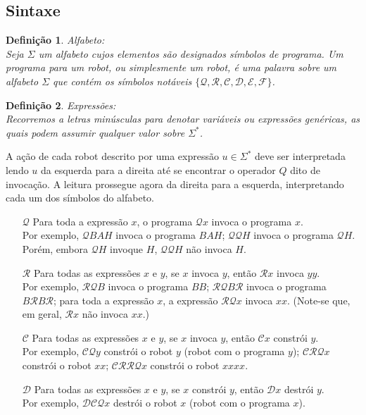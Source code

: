 \documentclass[10pt,a4paper]{report}
\newtheorem{definition}{Definição}
\begin{document}
\subsection{Sintaxe}
\begin{definition}
Alfabeto:\\
Seja $\Sigma$ um alfabeto cujos elementos são designados símbolos de programa. Um programa para um robot, ou simplesmente um robot, é uma palavra sobre um alfabeto $\Sigma$ que contém os símbolos notáveis $\{\mathcal{Q}, \mathcal{R}, \mathcal{C}, \mathcal{D}, \mathcal{E}, \mathcal{F}\}$.
\end{definition}
\begin{definition}
Expressões:\\
Recorremos a letras minúsculas para denotar variáveis ou expressões genéricas, as quais podem assumir qualquer valor sobre $\Sigma^*$.
\end{definition}
A ação de cada robot descrito por uma expressão $u \in \Sigma^*$ deve ser interpretada lendo $u$ da esquerda para a direita até se encontrar o operador $Q$ dito de invocação. A leitura prossegue agora da direita para a esquerda, interpretando cada um dos símbolos do alfabeto.
\begin{itemize}
\item[$\mathcal{Q}$] Para toda a expressão $x$, o programa $\mathcal{Q}x$ invoca o programa $x$.\\
Por exemplo, $\mathcal{Q}BAH$ invoca o programa $BAH$; $\mathcal{QQ}H$ invoca o programa $\mathcal{Q}H$. Porém, embora $\mathcal{Q}H$ invoque $H$, $\mathcal{QQ}H$ não invoca $H$.
\item[$\mathcal{R}$] Para todas as expressões $x$ e $y$, se $x$ invoca $y$, então $\mathcal{R}x$ invoca $yy$.\\
Por exemplo, $\mathcal{RQ}B$ invoca o programa $BB$; $\mathcal{RQ}B\mathcal{R}$ invoca o programa $B\mathcal{R}B\mathcal{R}$; para toda a expressão $x$, a expressão $\mathcal{RQ}x$ invoca $xx$. (Note-se que, em geral, $\mathcal{R}x$ não invoca $xx$.)
\item[$\mathcal{C}$] Para todas as expressões $x$ e $y$, se $x$ invoca $y$, então $\mathcal{C}x$ constrói $y$.\\
Por exemplo, $\mathcal{CQ}y$ constrói o robot $y$ (robot com o programa $y$); $\mathcal{CRQ}x$ constrói o robot $xx$; $\mathcal{CRRQ}x$ constrói o robot $xxxx$.
\item[$\mathcal{D}$] Para todas as expressões $x$ e $y$, se $x$ constrói $y$, então $\mathcal{D}x$ destrói $y$.\\
Por exemplo, $\mathcal{DCQ}x$ destrói o robot $x$ (robot com o programa $x$).
\end{itemize}
\end{document}
